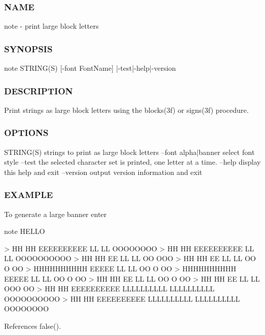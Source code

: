 \subsubsection*{N\+A\+ME}

note -\/ print large block letters 

\subsubsection*{S\+Y\+N\+O\+P\+S\+IS}

\begin{DoxyVerb} note STRING(S) [-font FontName] |-test|-help|-version
\end{DoxyVerb}


\subsubsection*{D\+E\+S\+C\+R\+I\+P\+T\+I\+ON}

Print strings as large block letters using the blocks(3f) or signs(3f) procedure.

\subsubsection*{O\+P\+T\+I\+O\+NS}

S\+T\+R\+I\+N\+G(\+S) strings to print as large block letters --font alpha$\vert$banner select font style --test the selected character set is printed, one letter at a time. --help display this help and exit --version output version information and exit

\subsubsection*{E\+X\+A\+M\+P\+LE}

\begin{DoxyVerb} To generate a large banner enter

    note HELLO

    >  HH      HH  EEEEEEEEEE  LL          LL           OOOOOOOO
    >  HH      HH  EEEEEEEEEE  LL          LL          OOOOOOOOOO
    >  HH      HH  EE          LL          LL          OO     OOO
    >  HH      HH  EE          LL          LL          OO    O OO
    >  HHHHHHHHHH  EEEEE       LL          LL          OO   O  OO
    >  HHHHHHHHHH  EEEEE       LL          LL          OO  O   OO
    >  HH      HH  EE          LL          LL          OO O    OO
    >  HH      HH  EE          LL          LL          OOO     OO
    >  HH      HH  EEEEEEEEEE  LLLLLLLLLL  LLLLLLLLLL  OOOOOOOOOO
    >  HH      HH  EEEEEEEEEE  LLLLLLLLLL  LLLLLLLLLL   OOOOOOOO \end{DoxyVerb}
 

References false().

